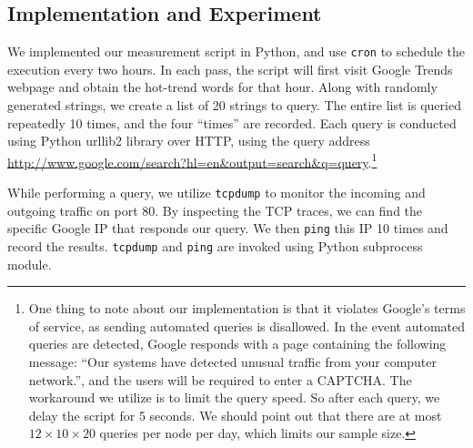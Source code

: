 

\subsection{Implementation and Experiment}
\label{sec:impl-exper}

We implemented our measurement script in Python, and use \texttt{cron} to schedule the execution every two hours. In each pass, the script will first visit Google Trends webpage and obtain the hot-trend words for that hour. Along with randomly generated strings, we create a list of 20 strings to query. The entire list is queried repeatedly 10 times, and the four ``times'' are recorded. Each query is conducted using Python urllib2 library over HTTP, using the query address \url{http://www.google.com/search?hl=en\&output=search\&q=query}.\footnote{One thing to note about our implementation is that it violates Google's terms of service, as sending automated queries is disallowed. In the event automated queries are detected, Google responds with a page containing the following message: ``Our systems have detected unusual traffic from your computer network.'', and the users will be required to enter a CAPTCHA. The workaround we utilize is to limit the query speed. So after each query, we delay the script for 5 seconds. We should point out that there are at most $12\times10\times20$ queries per node per day, which limits our sample size.}

While performing a query, we utilize \texttt{tcpdump} to monitor the incoming and outgoing traffic on port 80. By inspecting the TCP traces, we can find the specific Google IP that responds our query. We then \texttt{ping} this IP 10 times and record the results. \texttt{tcpdump} and \texttt{ping} are invoked using Python subprocess module.

